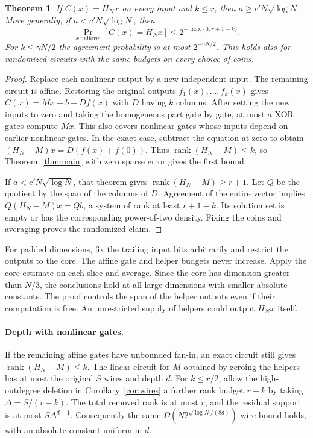 \documentclass[11pt]{article}
\newtheorem{theorem}{Theorem}[section]
\theoremstyle{definition}
\theoremstyle{remark}
\newcommand{\rk}{\operatorname{rank}}
\begin{document}
\begin{theorem}\label{thm:mixed}
If $C(x)=H_Nx$ on every input and $k\le r$, then
$a\ge c'N\sqrt{\log N}$. More generally, if $a<c'N\sqrt{\log N}$, then
\[
 \Pr_{x\ \mathrm{uniform}}[C(x)=H_Nx]
 \le 2^{-\max\{0,r+1-k\}} .
\]
For $k\le\gamma N/2$ the agreement probability is at most
$2^{-\gamma N/2}$. This holds also for randomized circuits with the
same budgets on every choice of coins.
\end{theorem}
\begin{proof}
Replace each nonlinear output by a new independent input. The remaining
circuit is affine. Restoring the original outputs $f_1(x),\ldots,f_k(x)$
gives $C(x)=Mx+b+Df(x)$ with $D$ having $k$ columns. After setting the
new inputs to zero and taking the homogeneous part gate by gate, at
most $a$ XOR gates compute $Mx$. This also covers nonlinear gates
whose inputs depend on earlier nonlinear gates. In the exact case,
subtract the equation at zero to obtain
$(H_N-M)x=D(f(x)+f(0))$. Thus $\rk(H_N-M)\le k$, so
Theorem~\ref{thm:main} with zero sparse error gives the first bound.

If $a<c'N\sqrt{\log N}$, that theorem gives $\rk(H_N-M)\ge r+1$.
Let $Q$ be the quotient by the span of the columns of $D$. Agreement
of the entire vector implies $Q(H_N-M)x=Qb$, a system of rank at least
$r+1-k$. Its solution set is empty or has the corresponding power-of-two
density. Fixing the coins and averaging proves the randomized claim.
\end{proof}
For padded dimensions, fix the trailing input bits arbitrarily and
restrict the outputs to the core. The affine gate and helper budgets
never increase. Apply the core estimate on each slice and average.
Since the core has dimension greater than $N/3$, the conclusions hold
at all large dimensions with smaller absolute constants. The proof
controls the span of the helper outputs even if their computation is
free. An unrestricted supply of helpers could output $H_Nx$ itself.

\paragraph{Depth with nonlinear gates.}
If the remaining affine gates have unbounded fan-in, an exact circuit
still gives $\rk(H_N-M)\le k$. The linear circuit for $M$ obtained by
zeroing the helpers has at most the original $S$ wires and depth $d$.
For $k\le r/2$, allow the high-outdegree deletion in
Corollary~\ref{cor:wires} a further rank budget $r-k$ by taking
$\Delta=S/(r-k)$. The total removed rank is at most $r$, and the
residual support is at most $S\Delta^{d-1}$. Consequently the same
$\Omega(N2^{\sqrt{\log N}/(8d)})$ wire bound holds, with an absolute
constant uniform in $d$.
\end{document}

